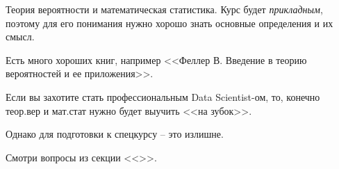 \begin{frame}{Теория вероятности и математическая статистика.}
Курс будет \textit{прикладным}, поэтому для его понимания 
нужно хорошо знать основные определения и их смысл.

Есть много хороших книг, например 
<<Феллер В. Введение в теорию вероятностей и ее приложения>>.

Если вы захотите стать профессиональным Data Scientist-ом,
то, конечно теор.вер и мат.стат нужно будет выучить <<на зубок>>.

Однако для подготовки к спецкурсу -- это излишне.

Смотри вопросы из секции <<>>. 
\end{frame}
   
  
